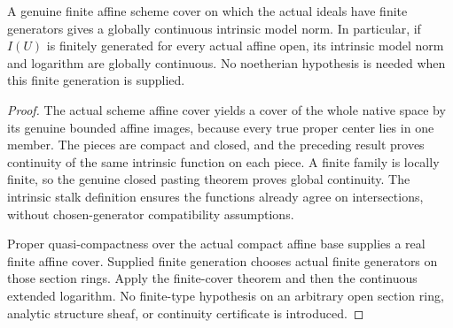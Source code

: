 \begin{theorem}
\label{scheme:continuous-native-model-ideals}
\leanok
{}
A genuine finite affine scheme cover on which the actual ideals have
finite generators gives a globally continuous intrinsic model norm.
In particular, if $I(U)$ is finitely generated for every actual affine
open, its intrinsic model norm and logarithm are globally continuous.
No noetherian hypothesis is needed when this finite generation is supplied.
\end{theorem}
\begin{proof}
The actual scheme affine cover yields a cover of the whole native space
by its genuine bounded affine images, because every true proper center
lies in one member. The pieces are compact and closed, and the preceding
result proves continuity of the same intrinsic function on each piece.
A finite family is locally finite, so the genuine closed pasting theorem
proves global continuity. The intrinsic stalk definition ensures the
functions already agree on intersections, without chosen-generator
compatibility assumptions.

Proper quasi-compactness over the actual compact affine base supplies a
real finite affine cover. Supplied finite generation chooses actual finite
generators on those section rings. Apply the finite-cover theorem and
then the continuous extended logarithm. No finite-type hypothesis on an
arbitrary open section ring, analytic structure sheaf, or continuity
certificate is introduced.
\end{proof}

